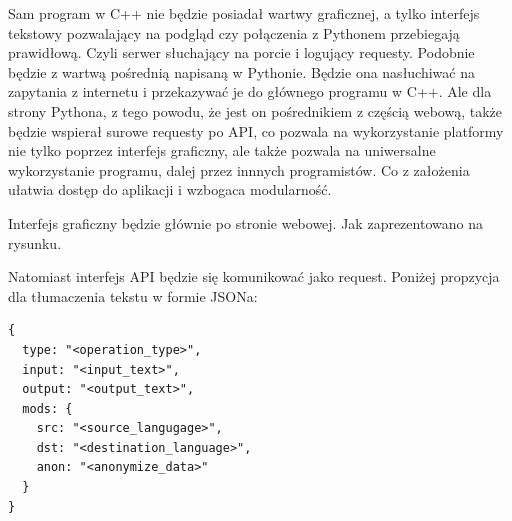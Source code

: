\documentclass{article}
\begin{document}
Sam program w C++ nie będzie posiadał wartwy graficznej, a tylko interfejs tekstowy pozwalający na podgląd czy połączenia z Pythonem przebiegają prawidłową. Czyli serwer słuchający na porcie i logujący requesty. Podobnie będzie z wartwą pośrednią napisaną w Pythonie. Będzie ona nasłuchiwać na zapytania z internetu i przekazywać je do głównego programu w C++. Ale dla strony Pythona, z tego powodu, że jest on pośrednikiem z częścią webową, także będzie wspierał surowe requesty po API, co pozwala na wykorzystanie platformy nie tylko poprzez interfejs graficzny, ale także pozwala na uniwersalne wykorzystanie programu, dalej przez innnych programistów. Co z założenia ułatwia dostęp do aplikacji i wzbogaca modularność. 

Interfejs graficzny będzie głównie po stronie webowej. Jak zaprezentowano na rysunku.

Natomiast interfejs API będzie się komunikować jako request. Poniżej propzycja dla tłumaczenia tekstu w formie JSONa:

\begin{lstlisting}
{
  type: "<operation_type>",
  input: "<input_text>",
  output: "<output_text>",
  mods: {
    src: "<source_langugage>", 
    dst: "<destination_language>",
    anon: "<anonymize_data>"
  }
}
\end{lstlisting}
\end{document}
